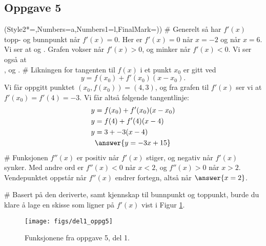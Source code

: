 \subsection*{Oppgave 5}
\begin{easylist}[enumerate]
\ListProperties(Style2*=,Numbers=a,Numbers1=l,FinalMark={)})
# Generelt så har $f'(x)$ topp- og bunnpunkt når $f'(x) = 0$.
Her er $f'(x) = 0$ når $x = -2$ og når $x = 6$. 
Vi ser at  og . Grafen vokser når $f'(x) > 0$, og minker når $f'(x) < 0$. Vi ser også at \\ , og .
# Likningen for tangenten til $f(x)$ i et punkt $x_0$ er gitt ved
\begin{equation*}
	y = f(x_0) + f'(x_0) ( x - x_0).
\end{equation*}
Vi får oppgitt punktet $(x_0, f(x_0)) = (4, 3)$, og fra grafen til $f'(x)$
ser vi at $f'(x_0) = f'(4) = -3$. Vi får altså følgende tangentlinje:
\begin{align*}
	y &= f(x_0) + f'(x_0) ( x - x_0) \\
	y &= f(4) + f'(4) ( x - 4) \\
	y &= 3 + -3 ( x - 4) \\
	& \answer{y = -3x + 15 }
\end{align*}
# Funksjonen $f''(x)$ er positiv når $f'(x)$ stiger, og negativ når $f'(x)$ synker.
Med andre ord er $f''(x) < 0$ når $x < 2$, og $f''(x) > 0$ når $x > 2$.
Vendepunktet oppstår når $f''(x)$ endrer fortegn, altså når $\answer{x=2}$.

# Basert på den deriverte, samt kjennskap til bunnpunkt og toppunkt, burde du klare å lage en skisse som ligner på $f'(x)$ vist i Figur \ref{fig:del1_oppg5}.

\begin{figure}[ht!]
	\centering
	\texttt{[image: figs/del1\_oppg5]}
	\caption{Funksjonene fra oppgave 5, del 1.}
	\label{fig:del1_oppg5}
\end{figure}
\end{easylist}

